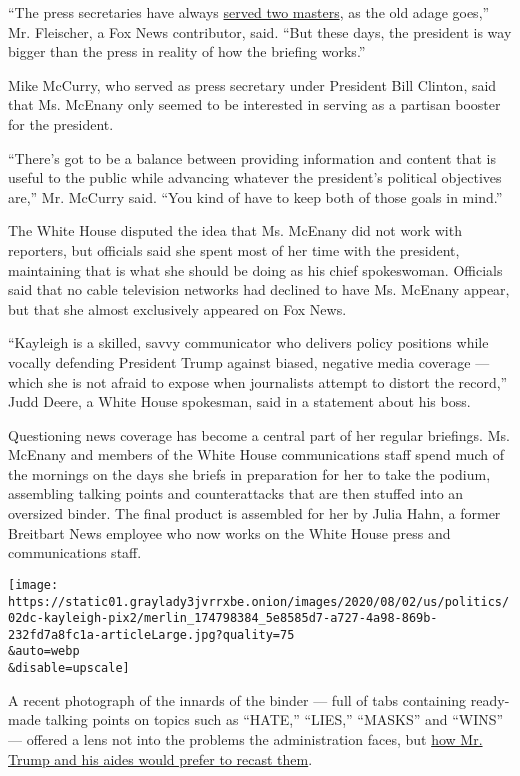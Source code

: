 ``The press secretaries have always
\href{https://www.nytimes3xbfgragh.onion/2001/01/22/us/public-lives-careful-steps-took-press-secretary-to-the-white-house.html}{served
two masters}, as the old adage goes,'' Mr. Fleischer, a Fox News
contributor, said. ``But these days, the president is way bigger than
the press in reality of how the briefing works.''

Mike McCurry, who served as press secretary under President Bill
Clinton, said that Ms. McEnany only seemed to be interested in serving
as a partisan booster for the president.

``There's got to be a balance between providing information and content
that is useful to the public while advancing whatever the president's
political objectives are,'' Mr. McCurry said. ``You kind of have to keep
both of those goals in mind.''

The White House disputed the idea that Ms. McEnany did not work with
reporters, but officials said she spent most of her time with the
president, maintaining that is what she should be doing as his chief
spokeswoman. Officials said that no cable television networks had
declined to have Ms. McEnany appear, but that she almost exclusively
appeared on Fox News.

``Kayleigh is a skilled, savvy communicator who delivers policy
positions while vocally defending President Trump against biased,
negative media coverage --- which she is not afraid to expose when
journalists attempt to distort the record,'' Judd Deere, a White House
spokesman, said in a statement about his boss.

Questioning news coverage has become a central part of her regular
briefings. Ms. McEnany and members of the White House communications
staff spend much of the mornings on the days she briefs in preparation
for her to take the podium, assembling talking points and counterattacks
that are then stuffed into an oversized binder. The final product is
assembled for her by Julia Hahn, a former Breitbart News employee who
now works on the White House press and communications staff.

\texttt{[image: https://static01.graylady3jvrrxbe.onion/images/2020/08/02/us/politics/02dc-kayleigh-pix2/merlin\_174798384\_5e8585d7-a727-4a98-869b-232fd7a8fc1a-articleLarge.jpg?quality=75\\\&auto=webp\\\&disable=upscale]}

A recent photograph of the innards of the binder --- full of tabs
containing ready-made talking points on topics such as ``HATE,''
``LIES,'' ``MASKS'' and ``WINS'' --- offered a lens not into the
problems the administration faces, but
\href{https://www.washingtonpost.com/politics/2020/07/17/heres-what-kayleigh-mcenany-would-like-talk-about/}{how
Mr. Trump and his aides would prefer to recast them}.

